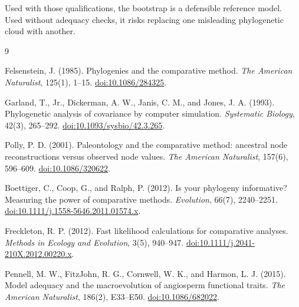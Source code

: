 \documentclass[10pt]{article}
\begin{document}
Used with those qualifications, the bootstrap is a defensible reference model.
Used without adequacy checks, it risks replacing one misleading phylogenetic
cloud with another.

\begin{thebibliography}{9}

Felsenstein, J. (1985).
Phylogenies and the comparative method.
\textit{The American Naturalist}, 125(1), 1--15.
\href{https://doi.org/10.1086/284325}{doi:10.1086/284325}.

Garland, T., Jr., Dickerman, A. W., Janis, C. M., and Jones, J. A. (1993).
Phylogenetic analysis of covariance by computer simulation.
\textit{Systematic Biology}, 42(3), 265--292.
\href{https://doi.org/10.1093/sysbio/42.3.265}{doi:10.1093/sysbio/42.3.265}.

Polly, P. D. (2001).
Paleontology and the comparative method: ancestral node reconstructions versus
observed node values.
\textit{The American Naturalist}, 157(6), 596--609.
\href{https://doi.org/10.1086/320622}{doi:10.1086/320622}.

Boettiger, C., Coop, G., and Ralph, P. (2012).
Is your phylogeny informative? Measuring the power of comparative methods.
\textit{Evolution}, 66(7), 2240--2251.
\href{https://doi.org/10.1111/j.1558-5646.2011.01574.x}%
{doi:10.1111/j.1558-5646.2011.01574.x}.

Freckleton, R. P. (2012).
Fast likelihood calculations for comparative analyses.
\textit{Methods in Ecology and Evolution}, 3(5), 940--947.
\href{https://doi.org/10.1111/j.2041-210X.2012.00220.x}%
{doi:10.1111/j.2041-210X.2012.00220.x}.

Pennell, M. W., FitzJohn, R. G., Cornwell, W. K., and Harmon, L. J. (2015).
Model adequacy and the macroevolution of angiosperm functional traits.
\textit{The American Naturalist}, 186(2), E33--E50.
\href{https://doi.org/10.1086/682022}{doi:10.1086/682022}.

\end{thebibliography}
\end{document}
